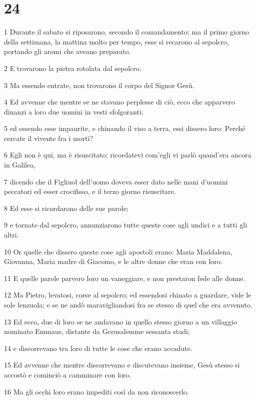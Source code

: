 \chapter{24}

\par 1 Durante il sabato si riposarono, secondo il comandamento; ma il primo giorno della settimana, la mattina molto per tempo, esse si recarono al sepolcro, portando gli aromi che aveano preparato.
\par 2 E trovarono la pietra rotolata dal sepolcro.
\par 3 Ma essendo entrate, non trovarono il corpo del Signor Gesù.
\par 4 Ed avvenne che mentre se ne stavano perplesse di ciò, ecco che apparvero dinanzi a loro due uomini in vesti sfolgoranti;
\par 5 ed essendo esse impaurite, e chinando il viso a terra, essi dissero loro: Perché cercate il vivente fra i morti?
\par 6 Egli non è qui, ma è risuscitato; ricordatevi com'egli vi parlò quand'era ancora in Galilea,
\par 7 dicendo che il Figliuol dell'uomo doveva esser dato nelle mani d'uomini peccatori ed esser crocifisso, e il terzo giorno risuscitare.
\par 8 Ed esse si ricordarono delle sue parole;
\par 9 e tornate dal sepolcro, annunziarono tutte queste cose agli undici e a tutti gli altri.
\par 10 Or quelle che dissero queste cose agli apostoli erano: Maria Maddalena, Giovanna, Maria madre di Giacomo, e le altre donne che eran con loro.
\par 11 E quelle parole parvero loro un vaneggiare, e non prestaron fede alle donne.
\par 12 Ma Pietro, levatosi, corse al sepolcro; ed essendosi chinato a guardare, vide le sole lenzuola; e se ne andò maravigliandosi fra se stesso di quel che era avvenuto.
\par 13 Ed ecco, due di loro se ne andavano in quello stesso giorno a un villaggio nominato Emmaus, distante da Gerusalemme sessanta stadi;
\par 14 e discorrevano tra loro di tutte le cose che erano accadute.
\par 15 Ed avvenne che mentre discorrevano e discutevano insieme, Gesù stesso si accostò e cominciò a camminare con loro.
\par 16 Ma gli occhi loro erano impediti così da non riconoscerlo.
